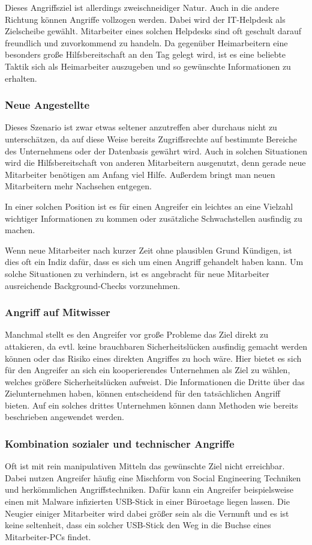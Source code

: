 Dieses Angriffsziel ist allerdings zweischneidiger Natur. Auch in die andere Richtung können Angriffe
vollzogen werden.
Dabei wird der IT-Helpdesk als Zielscheibe gewählt.
Mitarbeiter eines solchen Helpdesks sind oft geschult darauf freundlich und zuvorkommend zu handeln.
Da gegenüber Heimarbeitern eine besonders große Hilfsbereitschaft an den Tag gelegt wird, ist es eine
beliebte Taktik sich als Heimarbeiter auszugeben und so gewünschte Informationen zu erhalten.

\subsubsection{Neue Angestellte}\label{neueangestellte}
Dieses Szenario ist zwar etwas seltener anzutreffen aber durchaus nicht zu unterschätzen, da auf diese
Weise bereits Zugriffsrechte auf bestimmte Bereiche des Unternehmens oder der Datenbasis gewährt wird.
Auch in solchen Situationen wird die Hilfsbereitschaft von anderen Mitarbeitern ausgenutzt, denn
gerade neue Mitarbeiter benötigen am Anfang viel Hilfe.
Außerdem bringt man neuen Mitarbeitern mehr Nachsehen entgegen.

In einer solchen Position ist es für einen Angreifer ein leichtes an eine Vielzahl wichtiger
Informationen zu kommen oder zusätzliche Schwachstellen ausfindig zu machen.

Wenn neue Mitarbeiter nach kurzer Zeit ohne plausiblen Grund Kündigen, ist dies oft ein Indiz dafür,
dass es sich um einen Angriff gehandelt haben kann.
Um solche Situationen zu verhindern, ist es angebracht für neue Mitarbeiter ausreichende Background-Checks vorzunehmen.

\subsubsection{Angriff auf Mitwisser}\label{angriffaufmitwisser}
Manchmal stellt es den Angreifer vor große Probleme das Ziel direkt zu attakieren, da evtl. keine
brauchbaren Sicherheitslücken ausfindig gemacht werden können oder das Risiko eines direkten Angriffes
zu hoch wäre.
Hier bietet es sich für den Angreifer an sich ein kooperierendes Unternehmen als Ziel zu wählen,
welches größere Sicherheitslücken aufweist.
Die Informationen die Dritte über das Zielunternehmen haben, können entscheidend für den tatsächlichen
Angriff bieten.
Auf ein solches drittes Unternehmen können dann Methoden wie bereits beschrieben angewendet werden.

\subsubsection{Kombination sozialer und technischer Angriffe}\label{kombination}
Oft ist mit rein manipulativen Mitteln das gewünschte Ziel nicht erreichbar.
Dabei nutzen Angreifer häufig eine Mischform von Social Engineering Techniken und herkömmlichen
Angriffstechniken.
Dafür kann ein Angreifer beispielsweise einen mit Malware infizierten USB-Stick in einer Büroetage
liegen lassen.
Die Neugier einiger Mitarbeiter wird dabei größer sein als die Vernunft und es ist keine seltenheit,
dass ein solcher USB-Stick den Weg in die Buchse eines Mitarbeiter-PCs findet.

